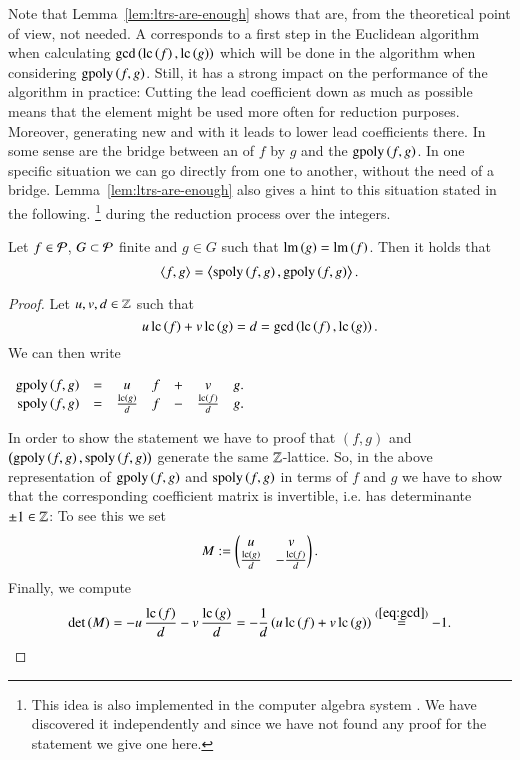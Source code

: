 Note that Lemma~\ref{lem:ltrs-are-enough} shows that \lcrs are, from the
theoretical point of view, not needed. A \lcr corresponds
to a first step in the Euclidean algorithm when calculating $\gcd\left(\mathrm{lc}\left({f}\right), \mathrm{lc}\left({g}\right)\right)$ which will be done in the algorithm when considering $\mathrm{gpoly}\left({f},{g}\right)$.
Still, it has a strong impact on the performance of the algorithm in practice:
Cutting the lead coefficient down as much as possible means that the element
might be used more often for reduction purposes. Moreover, generating new \spts
and \gpts with it leads to lower lead coefficients there. In some sense \lcrs are
the bridge between an \ltr of $f$ by $g$ and the $\mathrm{gpoly}\left({f},{g}\right)$. In one specific
situation we can go directly from one to another, without the need of a bridge. 
Lemma~\ref{lem:ltrs-are-enough} also gives a hint to this situation stated in
the following.
\footnote{This idea is also implemented in the computer algebra system
\macaulay. We have discovered it independently and since we have not
found any proof for the statement we give one here.}
during the reduction process over the integers.
\begin{lemma}
Let $f \in \mathcal{P}$, $G \subset \mathcal{P}$ finite and $g\in G$ such that
$\operatorname{lm}\left({g}\right) = \operatorname{lm}\left({f}\right)$. Then it holds that
\[\left\langle f,g\right\rangle
  = \left\langle \mathrm{spoly}\left({f},{g}\right), \mathrm{gpoly}\left({f},{g}\right)\right\rangle.\]
  \label{lem:m2-replace-trick}
\end{lemma}

\begin{proof}
Let $u,v, d \in \mathbb{Z}$ such that
\begin{equation}
u\, \mathrm{lc}\left({f}\right) + v\, \mathrm{lc}\left({g}\right) = d = \gcd\left(\mathrm{lc}\left({f}\right), \mathrm{lc}\left({g}\right)\right).
\label{eq:gcd}
\end{equation}
We can then write
\begin{center}
$
\begin{array}[]{rcccccc}
\gpoly fg &= & u& f& + &v& g.\\
\spoly fg &=& \frac{\lc g}{d}& f& - &\frac{\lc f}{d}&g.
\end{array}
$
\end{center}
In order to show the statement we have to proof that $(f,g)$ and $\left(\mathrm{gpoly}\left({f},{g}\right),
\mathrm{spoly}\left({f},{g}\right)\right)$ generate the same $\mathbb{Z}$-lattice. So, in the above
representation of $\mathrm{gpoly}\left({f},{g}\right)$ and $\mathrm{spoly}\left({f},{g}\right)$ in terms of $f$ and $g$ we have to
show that the corresponding coefficient matrix is invertible, i.e. has
determinante $\pm 1 \in \mathbb{Z}$:
To see this we set
\[M := \begin{pmatrix} u & v\\ \frac{\mathrm{lc}\left({g}\right)}{d} & -\frac{\mathrm{lc}\left({f}\right)}{d}\end{pmatrix}.\]
Finally, we compute
\[\det\left(M\right) = - u\, \frac{\mathrm{lc}\left({f}\right)}{d}
- v\, \frac{\mathrm{lc}\left({g}\right)}{d} = -\frac 1d \left(u\, \mathrm{lc}\left({f}\right) + v\, \mathrm{lc}\left({g}\right)\right)
  \stackrel{(\ref{eq:gcd})}{=} -1.\]
\end{proof}

